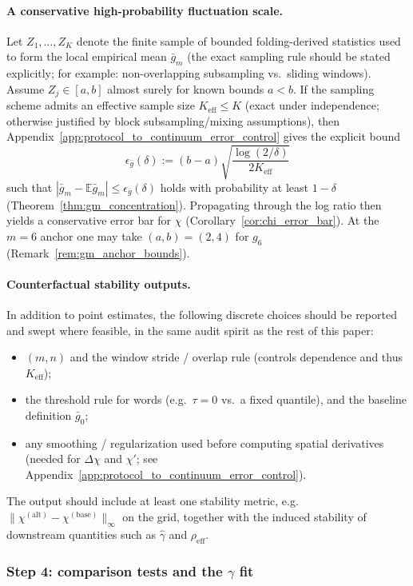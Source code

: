 \paragraph{A conservative high-probability fluctuation scale.}
\AuditTag Let $Z_1,\dots,Z_K$ denote the finite sample of bounded folding-derived statistics used to form the local empirical mean $\bar g_m$ (the exact sampling rule should be stated explicitly; for example: non-overlapping subsampling vs.\ sliding windows).
Assume $Z_j\in[a,b]$ almost surely for known bounds $a<b$.
If the sampling scheme admits an effective sample size $K_{\mathrm{eff}}\le K$ (exact under independence; otherwise justified by block subsampling/mixing assumptions), then Appendix~\ref{app:protocol_to_continuum_error_control} gives the explicit bound
\[
\epsilon_{\bar g}(\delta)
:=(b-a)\sqrt{\frac{\log(2/\delta)}{2K_{\mathrm{eff}}}}
\]
such that $|\bar g_m-\mathbb{E}\bar g_m|\le \epsilon_{\bar g}(\delta)$ holds with probability at least $1-\delta$ (Theorem~\ref{thm:gm_concentration}).
Propagating through the log ratio then yields a conservative error bar for $\chi$ (Corollary~\ref{cor:chi_error_bar}).
At the $m=6$ anchor one may take $(a,b)=(2,4)$ for $g_6$ (Remark~\ref{rem:gm_anchor_bounds}).

\paragraph{Counterfactual stability outputs.}
\AuditTag In addition to point estimates, the following discrete choices should be reported and swept where feasible, in the same audit spirit as the rest of this paper:
\begin{itemize}
\item $(m,n)$ and the window stride / overlap rule (controls dependence and thus $K_{\mathrm{eff}}$);
\item the threshold rule for words (e.g.\ $\tau=0$ vs.\ a fixed quantile), and the baseline definition $\bar g_0$;
\item any smoothing / regularization used before computing spatial derivatives (needed for $\Delta\chi$ and $\chi'$; see Appendix~\ref{app:protocol_to_continuum_error_control}).
\end{itemize}
The output should include at least one stability metric, e.g.\ $\|\chi^{(\mathrm{alt})}-\chi^{(\mathrm{base})}\|_\infty$ on the grid, together with the induced stability of downstream quantities such as $\widehat\gamma$ and $\rho_{\mathrm{eff}}$.

\subsubsection{Step 4: comparison tests and the \texorpdfstring{$\gamma$}{gamma} fit}
\label{subsec:chi_step4_tests}

